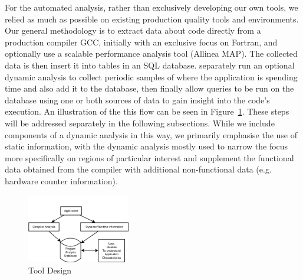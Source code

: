 For the automated analysis, rather than exclusively developing our own tools, we relied as much as possible on existing production quality tools and environments.
Our general methodology is to extract data about code directly from a production compiler \ac{GCC}, initially with an exclusive focus on Fortran, and optionally use a scalable performance analysis tool (Allinea MAP).
The collected data is then insert it into tables in an \acs{SQL} database. separately run an optional dynamic analysis to collect periodic samples of where the application is spending time and also add it to the database, then finally allow queries to be run on the database using one or both sources of data to gain insight into the code's execution.
An illustration of the this flow can be seen in Figure~\ref{fig:design}.
These steps will be addressed separately in the following subsections.
While we include components of a dynamic analysis in this way, we primarily emphasise the use of static information, with the dynamic analysis mostly used to narrow the focus more specifically on regions of particular interest and supplement the functional data obtained from the compiler with additional non-functional data (e.g. hardware counter information).

\begin{figure}
\begin{center}
\includegraphics[width=0.4\textwidth]{images/design.png}
\end{center}
\caption{Tool Design}
\label{fig:design}
\end{figure}

